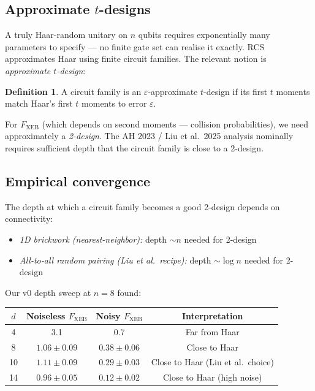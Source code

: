 \documentclass[11pt,a4paper]{article}
\theoremstyle{plain}
\theoremstyle{definition}
\newtheorem{definition}[theorem]{Definition}
\theoremstyle{remark}
\begin{document}
\subsection{Approximate $t$-designs}

A truly Haar-random unitary on $n$ qubits requires exponentially many parameters to specify --- no finite gate set can realise it exactly. RCS approximates Haar using finite circuit families. The relevant notion is \emph{approximate $t$-design}:

\begin{definition}
A circuit family is an $\varepsilon$-approximate $t$-design if its first $t$ moments match Haar's first $t$ moments to error $\varepsilon$.
\end{definition}

For $F_{\mathrm{XEB}}$ (which depends on second moments --- collision probabilities), we need approximately a \emph{2-design}. The AH 2023 / Liu et al.\ 2025 analysis nominally requires sufficient depth that the circuit family is close to a 2-design.

\subsection{Empirical convergence}

The depth at which a circuit family becomes a good 2-design depends on connectivity:
\begin{itemize}[itemsep=2pt,topsep=2pt]
  \item \emph{1D brickwork (nearest-neighbor):} depth $\sim n$ needed for 2-design
  \item \emph{All-to-all random pairing (Liu et al.\ recipe):} depth $\sim \log n$ needed for 2-design
\end{itemize}

Our v0 depth sweep at $n=8$ found:

\begin{center}
\small
\begin{tabular}{@{}cccc@{}}
\toprule
$d$ & Noiseless $F_{\mathrm{XEB}}$ & Noisy $F_{\mathrm{XEB}}$ & Interpretation \\
\midrule
4 & 3.1 & 0.7 & Far from Haar \\
8 & $1.06 \pm 0.09$ & $0.38 \pm 0.06$ & Close to Haar \\
10 & $1.11 \pm 0.09$ & $0.29 \pm 0.03$ & Close to Haar (Liu et al.\ choice) \\
14 & $0.96 \pm 0.05$ & $0.12 \pm 0.02$ & Close to Haar (high noise) \\
\bottomrule
\end{tabular}
\end{center}
\end{document}

